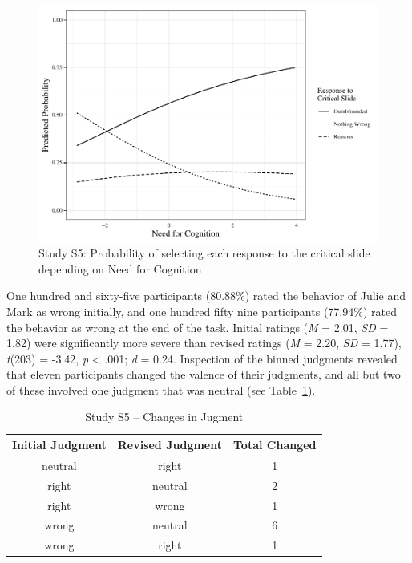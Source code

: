 \documentclass[
  american,
  man,floatsintext]{apa7}
\begin{document}
\begin{figure}[!h]
\includegraphics{Supplementary_files/figure-latex/ggplotlogit5-1} \caption{Study S5: Probability of selecting each response to the critical slide depending on Need for Cognition}\label{fig:ggplotlogit5}
\end{figure}

One hundred and sixty-five participants (80.88\%) rated the behavior of Julie and Mark as wrong initially, and one hundred fifty nine participants (77.94\%) rated the behavior as wrong at the end of the task. Initial ratings (\emph{M} = 2.01, \emph{SD} = 1.82) were significantly more severe than revised ratings (\emph{M} = 2.20, \emph{SD} = 1.77), \emph{t}(203) = -3.42, \emph{p} \textless{} .001; \emph{d} = 0.24. Inspection of the binned judgments revealed that eleven participants changed the valence of their judgments, and all but two of these involved one judgment that was neutral (see Table~\ref{tab:tabS5change}).

\begin{table}[tbp]

\begin{center}
\begin{threeparttable}

\caption{\label{tab:tabS5change}Study S5 – Changes in Jugment}

\begin{tabular}{ccc}
\toprule
Initial Judgment & \multicolumn{1}{c}{Revised Judgment} & \multicolumn{1}{c}{Total Changed}\\
\midrule
neutral & right & 1\\
right & neutral & 2\\
right & wrong & 1\\
wrong & neutral & 6\\
wrong & right & 1\\
\bottomrule
\end{tabular}

\end{threeparttable}
\end{center}

\end{table}
\end{document}
